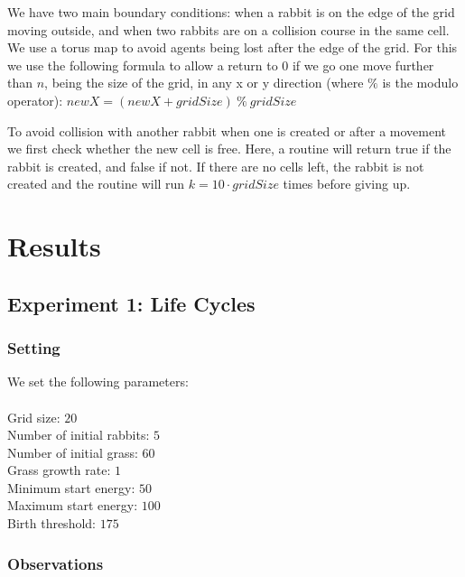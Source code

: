 \documentclass[11pt]{article}
\begin{document}
We have two main boundary conditions: when a rabbit is on the edge of the grid moving outside, and when two rabbits are on a collision course in the same cell.\\
\indent We use a torus map to avoid agents being lost after the edge of the grid. For this we use the following formula to allow a return to $0$ if we go one move further than $n$, being the size of the grid, in any x or y direction (where $\%$ is the modulo operator): $newX= (newX + gridSize) \ \% \ gridSize$

\indent To avoid collision with another rabbit when one is created or after a movement we first check whether the new cell is free. Here, a routine will return true if the rabbit is created, and false if not. If there are no cells left, the rabbit is not created and the routine will run $k=10\cdot gridSize$ times before giving up.

\section{Results}

\subsection{Experiment 1: Life Cycles}

\subsubsection{Setting}

We set the following parameters: \\
\\
Grid size: $20$ \\
Number of initial rabbits: $5$ \\
Number of initial grass: $60$ \\
Grass growth rate: $1$ \\
Minimum start energy: $50$ \\
Maximum start energy: $100$ \\
Birth threshold: $175$

\subsubsection{Observations}
\end{document}
